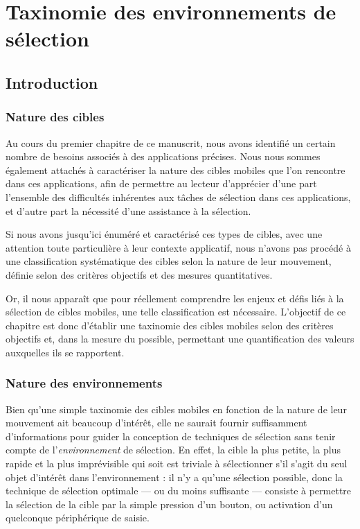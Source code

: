 
\chapter[Taxinomie des environnements de sélection]{Taxinomie des environnements de sélection}
\minitoc
\label{chap3}
\cleardoublepage

\section{Introduction}

	\subsection{Nature des cibles}
	Au cours du premier chapitre de ce manuscrit, nous avons identifié un certain nombre de besoins associés à des applications précises. Nous nous sommes également attachés à caractériser la nature des cibles mobiles que l'on rencontre dans ces applications, afin de permettre au lecteur d'apprécier d'une part l'ensemble des difficultés inhérentes aux tâches de sélection dans ces applications, et d'autre part la nécessité d'une assistance à la sélection.
	
	Si nous avons jusqu'ici énuméré et caractérisé ces types de cibles, avec une attention toute particulière à leur contexte applicatif, nous n'avons pas procédé à une classification systématique des cibles selon la nature de leur mouvement, définie selon des critères objectifs et des mesures quantitatives.
	
	Or, il nous apparaît que pour réellement comprendre les enjeux et défis liés à la sélection de cibles mobiles, une telle classification est nécessaire. L'objectif de ce chapitre est donc d'établir une taxinomie des cibles mobiles selon des critères objectifs et, dans la mesure du possible, permettant une quantification des valeurs auxquelles ils se rapportent.
	
	\subsection{Nature des environnements}
	Bien qu'une \og simple \fg{} taxinomie des cibles mobiles en fonction de la nature de leur mouvement ait beaucoup d'intérêt, elle ne saurait fournir suffisamment d'informations pour guider la conception de techniques de sélection sans tenir compte de l'\emph{environnement} de sélection. En effet, la cible la plus petite, la plus rapide et la plus imprévisible qui soit est triviale à sélectionner s'il s'agit du seul objet d'intérêt dans l'environnement : il n'y a qu'une sélection possible, donc la technique de sélection optimale --- ou du moins suffisante --- consiste à permettre la sélection de la cible par la simple pression d'un bouton, ou activation d'un quelconque périphérique de saisie.
	
